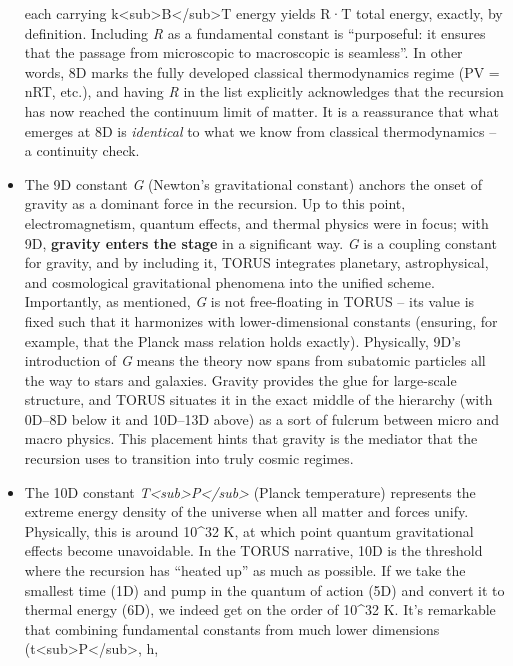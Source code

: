 \begin{itemize}
  each carrying
  k\textless{}sub\textgreater{}B\textless{}/sub\textgreater{}T energy
  yields R·T total energy, exactly, by definition. Including \emph{R} as
  a fundamental constant is ``purposeful: it ensures that the passage
  from microscopic to macroscopic is seamless''​. In other words, 8D
  marks the fully developed classical thermodynamics regime (PV = nRT,
  etc.), and having \emph{R} in the list explicitly acknowledges that
  the recursion has now reached the continuum limit of matter. It is a
  reassurance that what emerges at 8D is \emph{identical} to what we
  know from classical thermodynamics -- a continuity check.
\item
  The 9D constant \emph{G} (Newton's gravitational constant) anchors the
  onset of gravity as a dominant force in the recursion. Up to this
  point, electromagnetism, quantum effects, and thermal physics were in
  focus; with 9D, \textbf{gravity enters the stage} in a significant
  way. \emph{G} is a coupling constant for gravity, and by including it,
  TORUS integrates planetary, astrophysical, and cosmological
  gravitational phenomena into the unified scheme. Importantly, as
  mentioned, \emph{G} is not free-floating in TORUS -- its value is
  fixed such that it harmonizes with lower-dimensional constants
  (ensuring, for example, that the Planck mass relation holds exactly)​.
  Physically, 9D's introduction of \emph{G} means the theory now spans
  from subatomic particles all the way to stars and galaxies. Gravity
  provides the glue for large-scale structure, and TORUS situates it in
  the exact middle of the hierarchy (with 0D--8D below it and 10D--13D
  above) as a sort of fulcrum between micro and macro physics. This
  placement hints that gravity is the mediator that the recursion uses
  to transition into truly cosmic regimes.
\item
  The 10D constant
  \emph{T\textless{}sub\textgreater{}P\textless{}/sub\textgreater{}}
  (Planck temperature) represents the extreme energy density of the
  universe when all matter and forces unify. Physically, this is around
  10\^{}32 K, at which point quantum gravitational effects become
  unavoidable. In the TORUS narrative, 10D is the threshold where the
  recursion has ``heated up'' as much as possible​. If we take the
  smallest time (1D) and pump in the quantum of action (5D) and convert
  it to thermal energy (6D), we indeed get on the order of 10\^{}32 K​.
  It's remarkable that combining fundamental constants from much lower
  dimensions
  (t\textless{}sub\textgreater{}P\textless{}/sub\textgreater{}, h,

\end{itemize}
